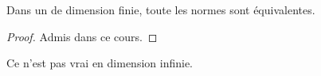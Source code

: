                         \begin{theorem}
                            Dans un \rev{} de dimension finie, toute les normes sont équivalentes.
                        \end{theorem}

                        \begin{proof}
                            Admis dans ce cours.
                        \end{proof}

                        \begin{remark}
                            Ce n'est pas vrai en dimension infinie. %
                        \end{remark}




